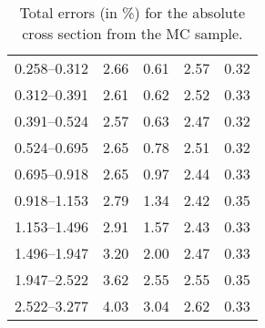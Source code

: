 \begin{table}
\begin{center}
\begin{tabular}{@{}l l l l l@{}}
            0.258--0.312 & 2.66 & 0.61 & 2.57 & 0.32  \\
            0.312--0.391 & 2.61 & 0.62 & 2.52 & 0.33  \\
            0.391--0.524 & 2.57 & 0.63 & 2.47 & 0.32  \\
            0.524--0.695 & 2.65 & 0.78 & 2.51 & 0.32  \\
            0.695--0.918 & 2.65 & 0.97 & 2.44 & 0.33  \\
            0.918--1.153 & 2.79 & 1.34 & 2.42 & 0.35  \\
            1.153--1.496 & 2.91 & 1.57 & 2.43 & 0.33  \\
            1.496--1.947 & 3.20 & 2.00 & 2.47 & 0.33  \\
            1.947--2.522 & 3.62 & 2.55 & 2.55 & 0.35  \\
            2.522--3.277 & 4.03 & 3.04 & 2.62 & 0.33  \\
            \bottomrule
        \end{tabular}
    \end{center}
    \caption{
        Total errors (in \%) for the absolute cross section from the \POWHEG
        MC sample.
    }
    \label{tab:powheg_uncert_abs}
\end{table}
